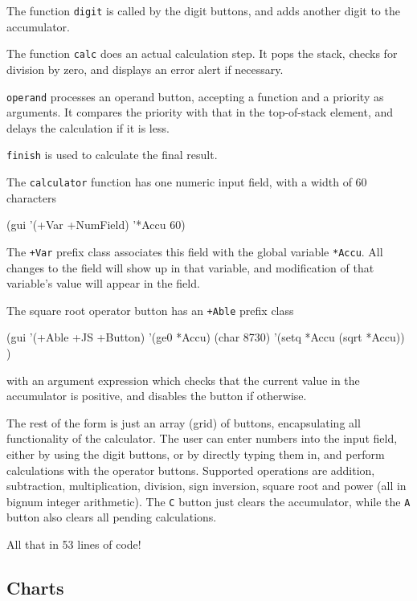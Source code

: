 The function \texttt{digit} is called by the digit buttons, and adds another
digit to the accumulator.

The function \texttt{calc} does an actual calculation step. It pops the stack,
checks for division by zero, and displays an error alert if necessary.

\texttt{operand} processes an operand button, accepting a function and a
priority as arguments. It compares the priority with that in the
top-of-stack element, and delays the calculation if it is less.

\texttt{finish} is used to calculate the final result.

The \texttt{calculator} function has one numeric input field, with a width of
60 characters


\begin{wideverbatim}
(gui '(+Var +NumField) '*Accu 60)
\end{wideverbatim}

The \texttt{+Var} prefix class associates this field with the global variable
\texttt{*Accu}. All changes to the field will show up in that variable, and
modification of that variable's value will appear in the field.

The square root operator button has an \texttt{+Able} prefix class


\begin{wideverbatim}
(gui '(+Able +JS +Button) '(ge0 *Accu) (char 8730)
   '(setq *Accu (sqrt *Accu)) )
\end{wideverbatim}

with an argument expression which checks that the current value in the
accumulator is positive, and disables the button if otherwise.

The rest of the form is just an array (grid) of buttons, encapsulating
all functionality of the calculator. The user can enter numbers into the
input field, either by using the digit buttons, or by directly typing
them in, and perform calculations with the operator buttons. Supported
operations are addition, subtraction, multiplication, division, sign
inversion, square root and power (all in bignum integer arithmetic). The
 \texttt{C}  button just clears the accumulator, while the  \texttt{A}  button also
clears all pending calculations.

All that in 53 lines of code!

\subsection{Charts}
\label{sec:appl-devel-charts}

